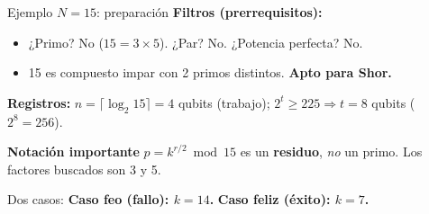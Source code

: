 \documentclass[aspectratio=169]{beamer}
\begin{document}
\begin{frame}{Ejemplo $N=15$: preparación}
  \textbf{Filtros (prerrequisitos):}
  \begin{itemize}
    \item ¿Primo? No ($15=3\times5$). \quad
          ¿Par? No. \quad
          ¿Potencia perfecta? No.
    \item[$\checkmark$] 15 es compuesto impar con 2 primos distintos.
          \textbf{Apto para Shor.}
  \end{itemize}

  \textbf{Registros:}
  $n=\lceil\log_2 15\rceil=4$ qubits (trabajo); \;
  $2^t\geq 225\Rightarrow t=8$ qubits ($2^8=256$).

  \begin{alertblock}{\textbf{Notación importante}}
    \small $p = k^{r/2}\bmod 15$ es un \textbf{residuo},
    \emph{no} un primo. Los factores buscados son 3 y 5.
  \end{alertblock}

  Dos casos:
  \textcolor{alerta}{\textbf{Caso feo (fallo): $k=14$.}} \quad
  \textcolor{cuantico!80!black}{\textbf{Caso feliz (éxito): $k=7$.}}

\end{frame}
\end{document}
